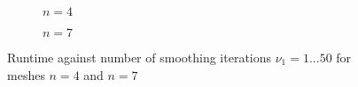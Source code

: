 \documentclass[11pt,a4paper]{article}
\begin{document}
\begin{figure}[h!]
	\centering
	\begin{subfigure}[h!]{.49\textwidth}
		\begin{center}
			\resizebox{0.52\width}{!}{}
			\caption{$n=4$}
			\label{fig::TimNu1}
		\end{center}	
	\end{subfigure}
	\hfill
	\begin{subfigure}[h!]{.49\textwidth}
		\centering
		\resizebox{0.52\width}{!}{}
		\caption{$n=7$}
		\label{fig::TimNu2}
	\end{subfigure}
	\caption{Runtime against number of smoothing iterations $\nu_1 = 1...50 $ for meshes $n=4$ and $n=7$ }
	\label{fig::TimNu}
\end{figure}

\end{document}
